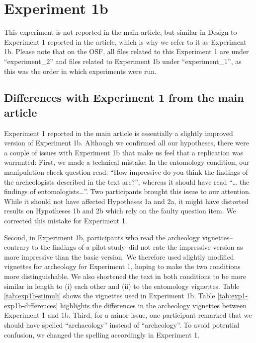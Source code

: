 \documentclass[
  english,
  doc,floatsintext]{apa6}
\begin{document}
\clearpage

\section{Experiment 1b}\label{exp1b}

This experiment is not reported in the main article, but similar in Design to Experiment 1 reported in the article, which is why we refer to it as Experiment 1b. Please note that on the OSF, all files related to this Experiment 1 are under ``experiment\_2'' and files related to Experiment 1b under ``experiment\_1'', as this was the order in which experiments were run.

\subsection{Differences with Experiment 1 from the main article}\label{differences-with-experiment-1-from-the-main-article}

\FloatBarrier

Experiment 1 reported in the main article is essentially a slightly improved version of Experiment 1b. Although we confirmed all our hypotheses, there were a couple of issues with Experiment 1b that make us feel that a replication was warranted: First, we made a technical mistake: In the entomology condition, our manipulation check question read: ``How impressive do you think the findings of the archeologists described in the text are?'', whereas it should have read ``\ldots{} the findings of entomologists\ldots{}''. Two participants brought this issue to our attention. While it should not have affected Hypotheses 1a and 2a, it might have distorted results on Hypotheses 1b and 2b which rely on the faulty question item. We corrected this mistake for Experiment 1.

Second, in Experiment 1b, participants who read the archeology vignettes--contrary to the findings of a pilot study--did not rate the impressive version as more impressive than the basic version. We therefore used slightly modified vignettes for archeology for Experiment 1, hoping to make the two conditions more distinguishable. We also shortened the text in both conditions to be more similar in length to (i) each other and (ii) to the entomology vignettes. Table \ref{tab:exp1b-stimuli} shows the vignettes used in Experiment 1b. Table \ref{tab:exp1-exp1b-differences} highlights the differences in the archeology vignettes between Experiment 1 and 1b. Third, for a minor issue, one participant remarked that we should have spelled ``archaeology'' instead of ``archeology''. To avoid potential confusion, we changed the spelling accordingly in Experiment 1.
\end{document}
